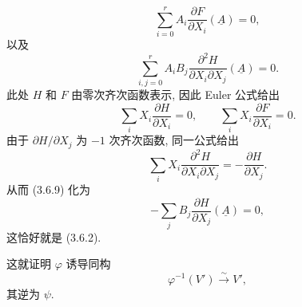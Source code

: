 \begin{equation}\tag{3.6.8}
\sum_{i=0}^{r}A_i\frac{\partial F}{\partial X_i}(\underline A)=0,
\end{equation}
以及
\begin{equation}\tag{3.6.9}
\sum_{i,j=0}^{r}A_iB_j
\frac{\partial^2H}{\partial X_i\partial X_j}(\underline A)=0.
\end{equation}
此处 $H$ 和 $F$ 由零次齐次函数表示, 因此 Euler 公式给出
\begin{equation}\tag{3.6.10}
\sum_iX_i\frac{\partial H}{\partial X_i}=0,
\qquad
\sum_iX_i\frac{\partial F}{\partial X_i}=0.
\end{equation}
由于 $\partial H/\partial X_j$ 为 $-1$ 次齐次函数, 同一公式给出
\[
\sum_iX_i\frac{\partial^2H}{\partial X_i\partial X_j}
=-\frac{\partial H}{\partial X_j}.
\]
从而 (3.6.9) 化为
\begin{equation}\tag{3.6.11}
-\sum_jB_j\frac{\partial H}{\partial X_j}(\underline A)=0,
\end{equation}
这恰好就是 (3.6.2).

这就证明 $\varphi$ 诱导同构
\begin{equation}\tag{3.6.12}
\varphi^{-1}(V')\xrightarrow{\sim}V',
\end{equation}
其逆为 $\psi$.